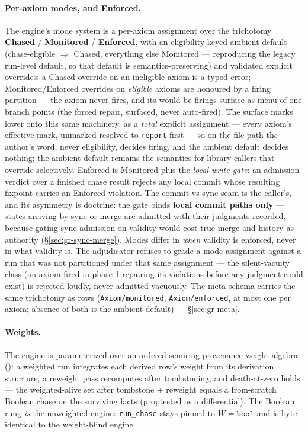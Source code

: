 \paragraph{Per-axiom modes, and Enforced.} The engine's mode system
is a per-axiom assignment over the trichotomy \textbf{Chased} /
\textbf{Monitored} / \textbf{Enforced}, with an eligibility-keyed
ambient default (chase-eligible $\Rightarrow$ Chased, everything else
Monitored — reproducing the legacy run-level default, so that default
is semantics-preserving) and validated explicit overrides: a Chased
override on an ineligible axiom is a typed error; Monitored/Enforced
overrides on \emph{eligible} axioms are honoured by a firing
partition — the axiom never fires, and its would-be firings surface
as menu-of-one branch points (the forced repair, surfaced, never
auto-fired). The surface marks lower onto this same machinery, as
a \emph{total} explicit assignment — every axiom's effective mark,
unmarked resolved to \texttt{report} first — so on the file path the
author's word, never eligibility, decides firing, and the ambient
default decides nothing; the ambient default remains the semantics
for library callers that override selectively. Enforced is Monitored
plus the \emph{local write gate}:
an admission verdict over a finished chase result rejects any local
commit whose resulting fixpoint carries an Enforced violation. The
commit-vs-sync seam is the caller's, and its asymmetry is doctrine:
the gate binds \textbf{local commit paths only} — states arriving by
sync or merge are admitted with their judgments recorded, because
gating sync admission on validity would cost true merge and
history-as-authority (\S\ref{sec:gr-sync-merge}). Modes differ in
\emph{when} validity is enforced, never in what validity is. The
adjudicator refuses to grade a mode assignment against a run that was
not partitioned under that same assignment — the silent-vacuity class
(an axiom fired in phase 1 repairing its violations before any
judgment could exist) is rejected loudly, never admitted vacuously.
The meta-schema carries the same trichotomy as rows
(\texttt{Axiom/monitored}, \texttt{Axiom/enforced}, at most one per
axiom; absence of both is the ambient default) —
\S\ref{sec:gr-meta}.

\paragraph{Weights.} The engine is parameterized over an
ordered-semiring provenance-weight algebra
(): a weighted run integrates each derived
row's weight from its derivation structure, a reweight pass
recomputes after tombstoning, and death-at-zero holds — the
weighted-alive set after tombstone + reweight equals a from-scratch
Boolean chase on the surviving facts (proptested as a differential).
The Boolean rung \emph{is} the unweighted engine: \texttt{run\_chase}
stays pinned to $W = \texttt{bool}$ and is byte-identical to the
weight-blind engine.


